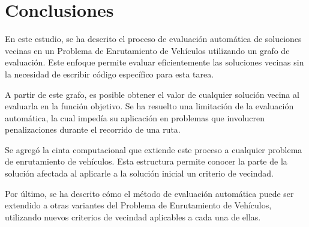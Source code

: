 \chapter*{Conclusiones}\label{chapter:Conclusions}

En este estudio, se ha descrito el proceso de evaluación automática de soluciones vecinas en un Problema de Enrutamiento de Vehículos utilizando un grafo de evaluación. Este enfoque permite evaluar eficientemente las soluciones vecinas sin la necesidad de escribir código específico para esta tarea. 

A partir de este grafo, es posible obtener el valor de cualquier solución vecina al evaluarla en la función objetivo. Se ha resuelto una limitación de la evaluación automática, la cual impedía su aplicación en problemas que involucren penalizaciones durante el recorrido de una ruta.

Se agregó la cinta computacional que extiende este proceso a cualquier problema de enrutamiento de vehículos. Esta estructura permite conocer la parte de la solución afectada al aplicarle a la solución inicial un criterio de vecindad.

Por último, se ha descrito cómo el método de evaluación automática puede ser extendido a otras variantes del Problema de Enrutamiento de Vehículos, utilizando nuevos criterios de vecindad aplicables a cada una de ellas.